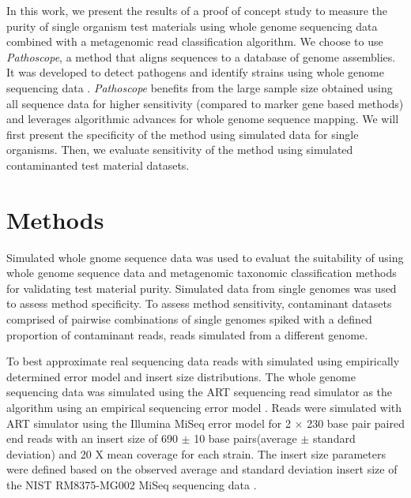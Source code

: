 \documentclass[fleqn,10pt,lineno]{wlpeerj}\usepackage[]{graphicx}\usepackage[]{color}
\begin{document}
In this work, we present the results of a proof of concept study to measure the purity of single organism test materials using whole genome sequencing data combined with a metagenomic read classification algorithm. 
We choose to use \textit{Pathoscope}, a method that aligns sequences to a database of genome assemblies. 
It was developed to detect pathogens and identify strains using whole genome sequencing data \citep{Francis2013}. 
\textit{Pathoscope} benefits from the large sample size obtained using all sequence data for higher sensitivity (compared to marker gene based methods) and leverages algorithmic advances for whole genome sequence mapping. 
We will first present the specificity of the method using simulated data for single organisms. 
Then, we evaluate sensitivity of the method using simulated contaminanted test material datasets.  


\section*{Methods}
Simulated whole gnome sequence data was used to evaluat the suitability of using whole genome sequence data and metagenomic taxonomic classification methods for validating test material purity. 
Simulated data from single genomes was used to assess method specificity. 
To assess method sensitivity, contaminant datasets comprised of pairwise combinations of single genomes spiked with a defined proportion of contaminant reads, reads simulated from a different genome.  

To best approximate real sequencing data reads with simulated using empirically determined error model and insert size distributions. 
The whole genome sequencing data was simulated using the ART sequencing read simulator as the algorithm using an empirical sequencing error model \citep{Huang2012}. 
Reads were simulated with ART simulator using the Illumina MiSeq error model for 2 $\times$ 230 base pair paired end reads with an insert size of 690 $\pm$ 10 base pairs(average $\pm$ standard deviation) and 20 X mean coverage for each strain. 
The insert size parameters were defined based on the observed average and standard deviation insert size of the NIST RM8375-MG002 MiSeq sequencing data \citep{olson2016pepr}.
\end{document}
